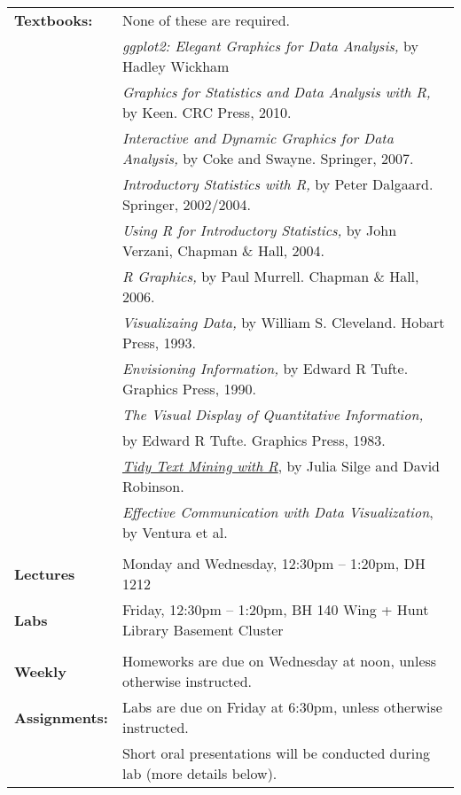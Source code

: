 \documentclass[11pt]{article}
\begin{document}
\begin{tabular}{ll}
{\bf Textbooks:} 
& None of these are required.\\
& {\it ggplot2: Elegant Graphics for Data Analysis,} by Hadley Wickham\\
& {\it Graphics for Statistics and Data Analysis with R,} by Keen.  CRC Press, 2010.\\
& {\it Interactive and Dynamic Graphics for Data Analysis,} by Coke and Swayne.  Springer, 2007.\\
& {\it Introductory Statistics with R,} by Peter Dalgaard.  Springer, 2002/2004.\\
& {\it Using R for Introductory Statistics,} by John Verzani, Chapman \& Hall, 2004.\\
& {\it R Graphics,} by Paul Murrell.  Chapman \& Hall, 2006.\\
& {\it Visualizaing Data,} by William S. Cleveland.  Hobart Press, 1993.\\
& {\it Envisioning Information,} by Edward R Tufte.  Graphics Press, 1990.\\
& {\it The Visual Display of Quantitative Information,} \\ & by Edward R Tufte.  Graphics Press, 1983.\\
& {\it \href{http://tidytextmining.com/}{Tidy Text Mining with R}}, by Julia Silge and David Robinson.\\
& {\it Effective Communication with Data Visualization}, by Ventura et al.\\
& \\




{\bf Lectures}
& Monday and Wednesday, 12:30pm -- 1:20pm, DH 1212\\


{\bf Labs}
& Friday, 12:30pm -- 1:20pm, BH 140 Wing + Hunt Library Basement Cluster\\

\vspace*{.05in}\\



 {\bf Weekly} & Homeworks are due on Wednesday at noon, unless otherwise instructed.\\
 {\bf Assignments:}
& Labs are due on Friday at 6:30pm, unless otherwise instructed.\\
& Short oral presentations will be conducted during lab (more details below).\\


\end{tabular}
\end{document}
